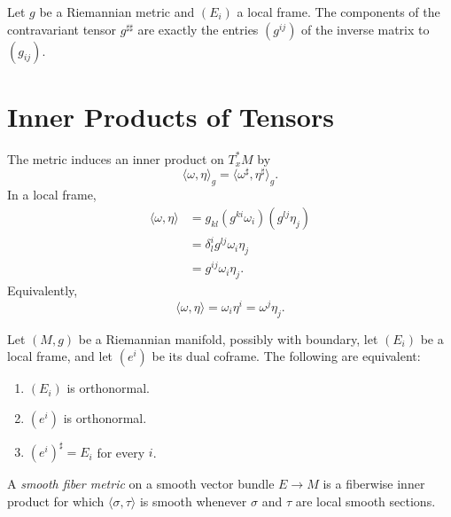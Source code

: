 \begin{proposition}
\label{prop:inverse-metric-ambiguity}
\leanok
{}
Let $g$ be a Riemannian metric and $(E_i)$ a local frame. The components of
the contravariant tensor $g^{\sharp\sharp}$ are exactly the entries $(g^{ij})$
of the inverse matrix to $(g_{ij})$.
\end{proposition}

\section{Inner Products of Tensors}

The metric induces an inner product on $T_x^*M$ by
\[
\langle\omega,\eta\rangle_g
=\langle\omega^\sharp,\eta^\sharp\rangle_g.
\]
In a local frame,
\begin{align*}
\langle\omega,\eta\rangle
&=g_{kl}(g^{ki}\omega_i)(g^{lj}\eta_j)\\
&=\delta_l^i g^{lj}\omega_i\eta_j\\
&=g^{ij}\omega_i\eta_j.
\end{align*}
Equivalently,
\[
\langle\omega,\eta\rangle=\omega_i\eta^i=\omega^j\eta_j.
\]

\begin{proposition}
\label{prop:orthonormal-frames-and-coframes}
\leanok
{}
Let $(M,g)$ be a Riemannian manifold, possibly with boundary, let $(E_i)$ be a
local frame, and let $(e^i)$ be its dual coframe. The following are
equivalent:
\begin{enumerate}
\item[(a)] $(E_i)$ is orthonormal.
\item[(b)] $(e^i)$ is orthonormal.
\item[(c)] $(e^i)^\sharp=E_i$ for every $i$.
\end{enumerate}
\end{proposition}

A \emph{smooth fiber metric} on a smooth vector bundle $E\to M$ is a fiberwise
inner product for which $\langle\sigma,\tau\rangle$ is smooth whenever $\sigma$ and
$\tau$ are local smooth sections.

